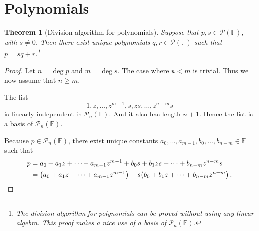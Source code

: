 \documentclass{tufte-handout}
\theoremstyle{plain} %
\newtheorem{thm}{Theorem}
\theoremstyle{definition}
\theoremstyle{remark}
\newcommand{\bra}[1]{\mathopen{}\left(#1\right)}
\newcommand{\F}{\mathbb{F}}
\newcommand{\mP}{\mathcal{P}}
\begin{document}
\section{Polynomials}
\begin{thm}[Division algorithm for polynomials]
	Suppose that $p,s\in\mP(\F)$, with $s\neq0$. Then there exist unique polynomials $q,r\in\mP(\F)$ such that $p=sq+r$.\footnote{The division algorithm for polynomials can be proved without using any linear algebra. This proof makes a nice use of a basis of $\mP_n(\F)$.}
\end{thm}
\begin{proof}
	Let $n=\deg p$ and $m=\deg s$. The case where $n<m$ is trivial. Thus we now assume that $n\geq m$.

	The list
	\[1,z,\dots,z^{m-1},s,zs,\dots,z^{n-m}s\]
	is linearly independent in $\mP_n(\F)$. And it also has length $n+1$. Hence the list is a basis of $\mP_n(\F)$.

	Because $p\in\mP_n(\F)$, there exist unique constants $a_0,\dots,a_{m-1},b_0,\dots,b_{n-m}\in\F$ such that
	\begin{align*}
		p&=a_0+a_1z+\cdots+a_{m-1}z^{m-1}+b_0s+b_1zs+\cdots+b_{n-m}z^{n-m}s\\
		&=\bra{a_0+a_1z+\cdots+a_{m-1}z^{m-1}}+s\bra{b_0+b_1z+\cdots+b_{n-m}z^{n-m}}.\qedhere
	\end{align*}
\end{proof}
\end{document}
